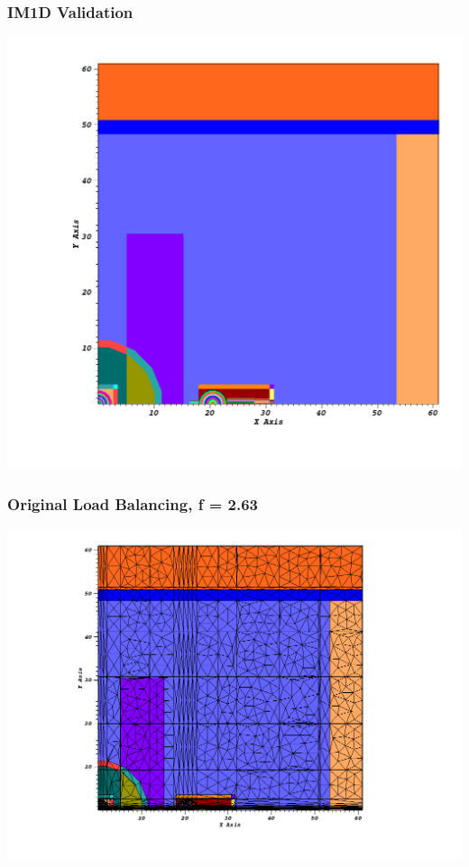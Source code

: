 \documentclass[compress]{beamer}
\begin{document}
\begin{frame}[t]\frametitle{IM1D Validation}
\centering
\includegraphics[scale=0.25]{figures/IM12D_val.png}
\end{frame}

\begin{frame}[t]\frametitle{Original Load Balancing, f = 2.63}
\centering
\includegraphics[scale=0.33]{figures/IM1_old_load_balance.png}
\end{frame}
\end{document}
